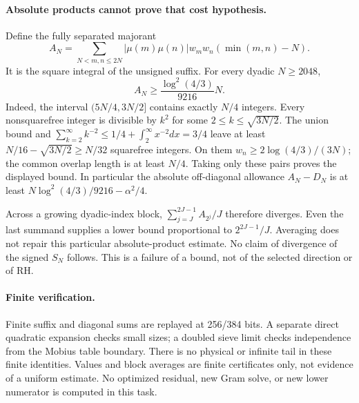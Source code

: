 \paragraph{Absolute products cannot prove that cost hypothesis.}
Define the fully separated majorant
\[
 A_N=\sum_{N<m,n\le2N}|\mu(m)\mu(n)|w_mw_n(\min(m,n)-N).
\]
It is the square integral of the unsigned suffix. For every dyadic
$N\ge2048$,
\[
 A_N\ge\frac{\log^2(4/3)}{9216}N.
\]
Indeed, the interval $(5N/4,3N/2]$ contains exactly $N/4$ integers.
Every nonsquarefree integer is divisible by $k^2$ for some
$2\le k\le\sqrt{3N/2}$. The union bound and
$\sum_{k=2}^\infty k^{-2}\le1/4+\int_2^\infty x^{-2}dx=3/4$
leave at least $N/16-\sqrt{3N/2}\ge N/32$ squarefree integers.
On them $w_n\ge2\log(4/3)/(3N)$; the common overlap length is
at least $N/4$. Taking only these pairs proves the displayed bound.
In particular the absolute off-diagonal allowance $A_N-D_N$ is at least
$N\log^2(4/3)/9216-\alpha^2/4$.

Across a growing dyadic-index block, $\sum_{j=J}^{2J-1}A_{2^j}/J$
therefore diverges. Even the last summand supplies a lower bound proportional
to $2^{2J-1}/J$. Averaging does not repair this particular absolute-product
estimate. No claim of divergence of the signed $S_N$ follows. This is a
failure of a bound, not of the selected direction or of RH.

\paragraph{Finite verification.} Finite suffix and diagonal sums are replayed
at 256/384 bits. A separate direct quadratic expansion checks small sizes;
a doubled sieve limit checks independence from the Mobius table boundary.
There is no physical or infinite tail in these finite identities. Values
and block averages are finite certificates only, not evidence of a uniform
estimate. No optimized residual, new Gram solve, or new lower numerator is
computed in this task.

